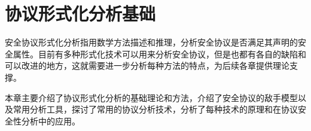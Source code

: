 \chapter{协议形式化分析基础}
安全协议形式化分析指用数学方法描述和推理，分析安全协议是否满足其声明的安全属性。目前有多种形式化技术可以用来分析安全协议，但是也都有各自的缺陷和可以改进的地方，这就需要进一步分析每种方法的特点，为后续各章提供理论支撑。

本章主要介绍了协议形式化分析的基础理论和方法，介绍了安全协议的敌手模型以及常用分析工具，探讨了常用的协议分析技术，分析了每种技术的原理和在协议安全性分析中的应用。



